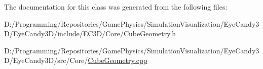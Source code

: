 The documentation for this class was generated from the following files\+:\begin{DoxyCompactItemize}
\item 
D\+:/\+Programming/\+Repositories/\+Game\+Physics/\+Simulation\+Visualization/\+Eye\+Candy3\+D/\+Eye\+Candy3\+D/include/\+E\+C3\+D/\+Core/\mbox{\hyperlink{_cube_geometry_8h}{Cube\+Geometry.\+h}}\item 
D\+:/\+Programming/\+Repositories/\+Game\+Physics/\+Simulation\+Visualization/\+Eye\+Candy3\+D/\+Eye\+Candy3\+D/src/\+Core/\mbox{\hyperlink{_cube_geometry_8cpp}{Cube\+Geometry.\+cpp}}\end{DoxyCompactItemize}
